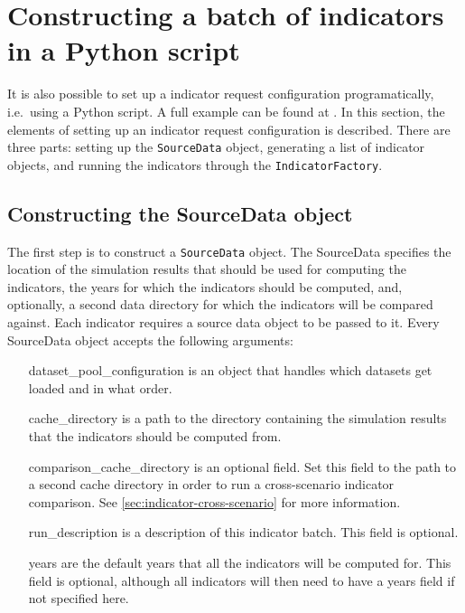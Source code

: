 \section{Constructing a batch of indicators in a Python script}
\label{sec:indicator-configuration-script}

It is also possible to set up a indicator request configuration
programatically, i.e.\ using a Python script. A full example can be found at 
. In this 
section, the elements of setting up an indicator request configuration 
is described. There are three parts: setting up the \verb|SourceData| 
object, generating a list of indicator objects, and running the 
indicators through the \verb|IndicatorFactory|.

\subsection{Constructing the SourceData object}

The first step is to construct a \verb|SourceData| object.
The SourceData specifies 
the location of the simulation results that should be 
used for computing the indicators, the years for which the indicators should be
computed, and, optionally, a second data directory for which the indicators will
be compared against. Each indicator requires a source data object to be passed
to it. Every SourceData object accepts the following arguments:
\begin{itemize}
\tight
\item[dataset_pool_configuration] is an object that handles which 
datasets get loaded and in what order. 

\item[cache_directory] is a path to the directory containing the 
simulation results that the indicators should be computed from.

\item[comparison_cache_directory] is an optional field. Set this field 
to the path to a second cache directory in order to run a 
cross-scenario indicator comparison. See \ref{sec:indicator-cross-scenario}
for more information.

\item[run_description] is a description of this indicator batch. 
This field is optional. 

\item[years] are the default years that all the indicators will be computed for.
This field is optional, although all indicators will then need to have a 
years field if not specified here.

\end{itemize}

